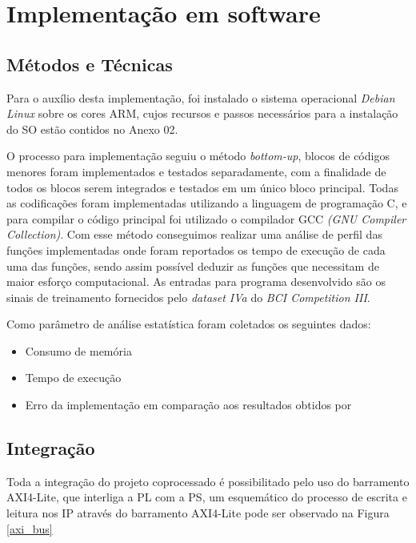\section{Implementação em software}

\subsection{Métodos e Técnicas}
Para o auxílio desta implementação, foi instalado o sistema operacional \textit{Debian Linux} sobre os cores ARM, cujos recursos e passos necessários
para a instalação do SO estão contidos no Anexo 02.

O processo para implementação seguiu o método \textit{bottom-up}, blocos de códigos menores foram implementados e testados separadamente, com a finalidade de todos os blocos serem integrados e testados em um único bloco principal. Todas as codificações foram implementadas utilizando a linguagem de programação C, e para compilar o código principal foi utilizado o compilador GCC \textit{(GNU Compiler Collection)}. Com esse método conseguimos realizar uma análise de perfil das funções implementadas onde foram reportados os tempo de execução de cada uma das funções, sendo assim possível deduzir as funções que necessitam de maior esforço computacional. As entradas para programa desenvolvido são os sinais de treinamento fornecidos pelo \textit{dataset IVa} do \textit{BCI Competition III}.

Como parâmetro de análise estatística foram coletados os seguintes dados:

\begin{itemize}[noitemsep]
\item Consumo de memória
\item Tempo de execução
\item Erro da implementação em comparação aos resultados obtidos por \cite{F.Lotte}
\end{itemize}

\subsection{Integração}
Toda a integração do projeto coprocessado é possibilitado pelo uso do barramento AXI4-Lite, que interliga a PL com a PS, 
um esquemático do processo de escrita e leitura nos IP através do barramento AXI4-Lite pode ser observado na Figura \ref{axi_bus}
\newpage

